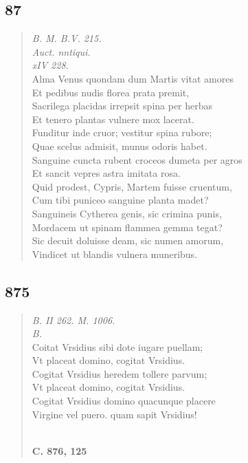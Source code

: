 \documentclass[11pt, a4paper]{report}
\begin{document}
            \subsection*{87}
      \begin{verse}
      \textit{B. M. B.V. 215.} \\ \textit{Auct. nntiqui.} \\ \textit{xIV 228.} \\ Alma Venus  \lbrack quondam \rbrack  dum Martis vitat amores \\ Et pedibus nudis florea prata premit, \\ Sacrilega placidas irrepsit spina per herbas \\ Et tenero plantas vulnere mox lacerat. \\ Funditur inde cruor; vestitur spina rubore; \\ Quae scelus admisit, munus odoris habet. \\ Sanguine cuncta rubent croceos dumeta per agros \\ Et sancit vepres astra imitata rosa. \\ Quid prodest, Cypris, Martem fuisse cruentum, \\ Cum tibi puniceo sanguine planta madet? \\ Sanguineis Cytherea genis, sic crimina punis, \\ Mordacem ut spinam flammea gemma tegat? \\ Sic decuit doluisse deam, sic numen amorum, \\ Vindicet ut blandis vulnera muneribus. \\ 
      \end{verse}
  
            \subsection*{875}
      \begin{verse}
      \textit{B. II 262. M. 1006.} \\ \textit{B.} \\ Coitat Vrsidius sibi dote iugare puellam; \\ Vt placeat domino, cogitat Vrsidius. \\ Cogitat Vrsidius heredem tollere parvum; \\ Vt placeat domino, cogitat Vrsidius. \\ Cogitat Vrsidius domino quacunque placere \\ Virgine vel puero. quam sapit Vrsidius! \\ 
        ﻿\pagebreak 
    \begin{center} \textbf{C. 876, 125} \end{center} \marginpar{[326]}  \marginpar{[40]} 
      \end{verse}
  
\end{document}

